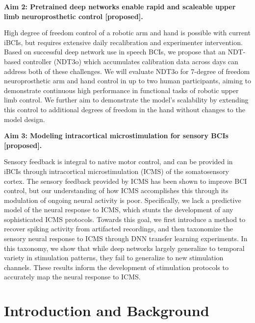 \documentclass[12pt,oneside]{report}
\begin{document}
\textbf{Aim 2: Pretrained deep networks enable rapid and scaleable upper limb neuroprosthetic control [proposed].}

High degree of freedom control of a robotic arm and hand is possible with current iBCIs, but requires extensive daily recalibration and experimenter intervention. Based on successful deep network use in speech BCIs, we propose that an NDT-based controller (NDT3o) which accumulates calibration data across days can address both of these challenges. We will evaluate NDT3o for 7-degree of freedom neuroprosthetic arm and hand control in up to two human participants, aiming to demonstrate continuous high performance in functional tasks of robotic upper limb control. We further aim to demonstrate the model’s scalability by extending this control to additional degrees of freedom in the hand without changes to the model design.

\textbf{Aim 3: Modeling intracortical microstimulation for sensory BCIs [proposed].}

Sensory feedback is integral to native motor control, and can be provided in iBCIs through intracortical microstimulation (ICMS) of the somatosensory cortex. The sensory feedback provided by ICMS has been shown to improve BCI control, but our understanding of how ICMS accomplishes this through its modulation of ongoing neural activity is poor. Specifically, we lack a predictive model of the neural response to ICMS, which stunts the development of any sophisticated ICMS protocols. Towards this goal, we first introduce a method to recover spiking activity from artifacted recordings, and then taxonomize the sensory neural response to ICMS through DNN transfer learning experiments. In this taxonomy, we show that while deep networks largely generalize to temporal variety in stimulation patterns, they fail to generalize to new stimulation channels. These results inform the development of stimulation protocols to accurately map the neural response to ICMS.

\tableofcontents

\cleardoublepage

\chapter{Introduction and Background}
\end{document}

